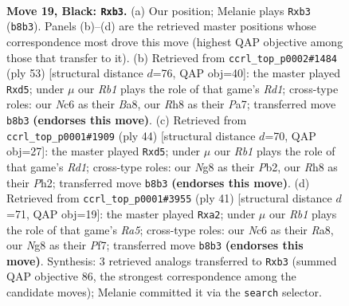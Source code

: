 \documentclass[11pt]{article}
\begin{document}
\clearpage

\begin{figure}[p]\centering
\begin{subfigure}{0.46\textwidth}\centering
\resizebox{\linewidth}{!}{%
\newchessgame
\chessboard[
  setfen={1r2k1nr/5ppp/B1n5/4P2P/P5b1/1P3N2/5KP1/RN5R b k - 0 19},
  showmover=false,
  pgfstyle=straightmove, color=movearrow, markmove={b8-b3}
]}
\caption{}
\end{subfigure}\hfill
\begin{subfigure}{0.46\textwidth}\centering
\resizebox{\linewidth}{!}{%
\newchessgame
\chessboard[
  setfen={b2r2k1/p5pp/Pp6/3PNr2/8/3R3P/5PP1/4R1K1 b - - 0 27},
  showmover=false,
  pgfstyle=straightmove, color=movearrow, markmove={d8-d5}
]}
\caption{}
\end{subfigure}
\\[4pt]
\begin{subfigure}{0.46\textwidth}\centering
\resizebox{\linewidth}{!}{%
\newchessgame
\chessboard[
  setfen={rn1rbk2/pp3pp1/6p1/3pN3/8/PB2P3/1P4PP/2RR2K1 w - - 0 23},
  showmover=false,
  pgfstyle=straightmove, color=movearrow, markmove={d1-d5}
]}
\caption{}
\end{subfigure}\hfill
\begin{subfigure}{0.46\textwidth}\centering
\resizebox{\linewidth}{!}{%
\newchessgame
\chessboard[
  setfen={r5k1/5p2/1pp1bp1p/8/r7/1NR3P1/PP2PP1P/R3K3 b - - 7 21},
  showmover=false,
  pgfstyle=straightmove, color=movearrow, markmove={a4-a2}
]}
\caption{}
\end{subfigure}
\caption{\textbf{Move 19, Black: \texttt{Rxb3}.} (a) Our position; Melanie plays \texttt{Rxb3} (\texttt{b8b3}). Panels (b)--(d) are the retrieved master positions whose correspondence most drove this move (highest QAP objective among those that transfer to it). (b) Retrieved from \texttt{ccrl\_top\_p0002\#1484} (ply 53) [structural distance $d$=76, QAP obj=40]: the master played \texttt{Rxd5}; under $\mu$ our \emph{Rb1} plays the role of that game's \emph{Rd1}; cross-type roles: our \emph{N}c6 as their \emph{B}a8, our \emph{R}h8 as their \emph{P}a7; transferred move \texttt{b8b3} \textbf{(endorses this move)}. (c) Retrieved from \texttt{ccrl\_top\_p0001\#1909} (ply 44) [structural distance $d$=70, QAP obj=27]: the master played \texttt{Rxd5}; under $\mu$ our \emph{Rb1} plays the role of that game's \emph{Rd1}; cross-type roles: our \emph{N}g8 as their \emph{P}b2, our \emph{R}h8 as their \emph{P}h2; transferred move \texttt{b8b3} \textbf{(endorses this move)}. (d) Retrieved from \texttt{ccrl\_top\_p0001\#3955} (ply 41) [structural distance $d$=71, QAP obj=19]: the master played \texttt{Rxa2}; under $\mu$ our \emph{Rb1} plays the role of that game's \emph{Ra5}; cross-type roles: our \emph{N}c6 as their \emph{R}a8, our \emph{N}g8 as their \emph{P}f7; transferred move \texttt{b8b3} \textbf{(endorses this move)}. Synthesis: 3 retrieved analogs transferred to \texttt{Rxb3} (summed QAP objective 86, the strongest correspondence among the candidate moves); Melanie committed it via the \texttt{search} selector.}
\label{fig:thought-m37}
\end{figure}
\end{document}

